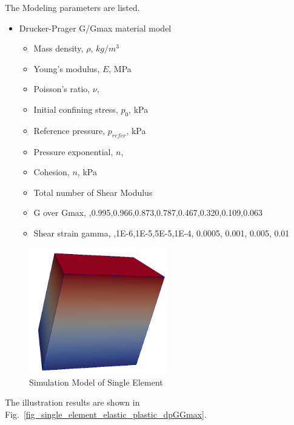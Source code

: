 The Modeling parameters are listed.
\begin{itemize}
  \item Drucker-Prager G/Gmax material model 
  \begin{itemize}
    \item Mass density, $\rho$, \enspace {} $kg/m^3$
    \item Young's modulus, $E$, \enspace {} MPa
    \item Poisson's ratio, $\nu$, \enspace {}
    \item Initial confining stress, $p_0$, \enspace {} kPa
    \item Reference pressure, $p_{refer} $, \enspace {} kPa
    \item Pressure exponential, $ n  $, \enspace {}
    \item Cohesion, $ n  $, \enspace {} kPa
    \item Total number of Shear Modulus \enspace {}
    \item G over Gmax, \enspace {},0.995,0.966,0.873,0.787,0.467,0.320,0.109,0.063
    \item Shear strain gamma, \enspace {},1E-6,1E-5,5E-5,1E-4, 0.0005, 0.001, 0.005, 0.01
  \end{itemize}
\end{itemize}

\begin{figure}[H]
  \centering
  \includegraphics[width = 6cm]{./Figure-files/Day3/Single_element_Models_illustrate_the_elastic-plastic_behavior/overview.png}
  \caption{Simulation Model of Single Element}
  \label{fig_single_element_elastic_plastic3}
\end{figure}


The illustration results are shown in Fig.~\ref{fig_single_element_elastic_plastic_dpGGmax}.

